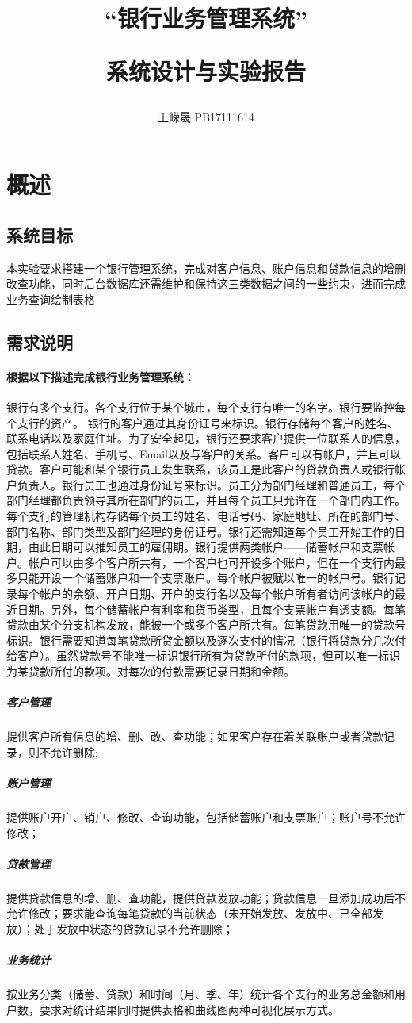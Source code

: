 \documentclass{article}
\title{“银行业务管理系统”\\ [2ex] \begin{large} 系统设计与实验报告 \end{large} }
\author{王嵘晟 PB17111614}
\begin{document}
	\maketitle
	\tableofcontents %
	\section{概述} %
	\subsection{系统目标} %
	\par{本实验要求搭建一个银行管理系统，完成对客户信息、账户信息和贷款信息的增删改查功能，同时后台数据库还需维护和保持这三类数据之间的一些约束，进而完成业务查询绘制表格}
	\subsection{需求说明}
	\paragraph{根据以下描述完成银行业务管理系统：}银行有多个支行。各个支行位于某个城市，每个支行有唯一的名字。银行要监控每个支行的资产。 银行的客户通过其身份证号来标识。银行存储每个客户的姓名、联系电话以及家庭住址。为了安全起见，银行还要求客户提供一位联系人的信息，包括联系人姓名、手机号、Email以及与客户的关系。客户可以有帐户，并且可以贷款。客户可能和某个银行员工发生联系，该员工是此客户的贷款负责人或银行帐户负责人。银行员工也通过身份证号来标识。员工分为部门经理和普通员工，每个部门经理都负责领导其所在部门的员工，并且每个员工只允许在一个部门内工作。每个支行的管理机构存储每个员工的姓名、电话号码、家庭地址、所在的部门号、部门名称、部门类型及部门经理的身份证号。银行还需知道每个员工开始工作的日期，由此日期可以推知员工的雇佣期。银行提供两类帐户——储蓄帐户和支票帐户。帐户可以由多个客户所共有，一个客户也可开设多个账户，但在一个支行内最多只能开设一个储蓄账户和一个支票账户。每个帐户被赋以唯一的帐户号。银行记录每个帐户的余额、开户日期、开户的支行名以及每个帐户所有者访问该帐户的最近日期。另外，每个储蓄帐户有利率和货币类型，且每个支票帐户有透支额。每笔贷款由某个分支机构发放，能被一个或多个客户所共有。每笔贷款用唯一的贷款号标识。银行需要知道每笔贷款所贷金额以及逐次支付的情况（银行将贷款分几次付给客户）。虽然贷款号不能唯一标识银行所有为贷款所付的款项，但可以唯一标识为某贷款所付的款项。对每次的付款需要记录日期和金额。
	\subparagraph{客户管理}提供客户所有信息的增、删、改、查功能；如果客户存在着关联账户或者贷款记录，则不允许删除;
	\subparagraph{账户管理}提供账户开户、销户、修改、查询功能，包括储蓄账户和支票账户；账户号不允许修改；
	\subparagraph{贷款管理}提供贷款信息的增、删、查功能，提供贷款发放功能；贷款信息一旦添加成功后不允许修改；要求能查询每笔贷款的当前状态（未开始发放、发放中、已全部发放）；处于发放中状态的贷款记录不允许删除；
	\subparagraph{业务统计}按业务分类（储蓄、贷款）和时间（月、季、年）统计各个支行的业务总金额和用户数，要求对统计结果同时提供表格和曲线图两种可视化展示方式。
\end{document}
